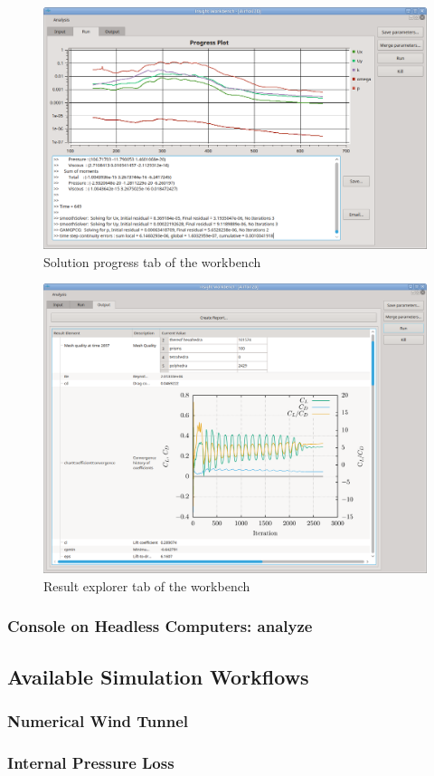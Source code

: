 \begin{figure}[tb]
\centering
\includegraphics[width=\linewidth]{figs/workbench/workbench_airfoil_run}
\caption{Solution progress tab of the workbench}
\label{fig:workbench_progress}
\end{figure}

\begin{figure}[tb]
\centering
\includegraphics[width=\linewidth]{figs/workbench/workbench_airfoil_result}
\caption{Result explorer tab of the workbench}
\label{fig:workbench_result}
\end{figure}

\subsubsection{Console on Headless Computers: analyze}\label{sec:analyze}


\subsection{Available Simulation Workflows}

\subsubsection{Numerical Wind Tunnel}

\subsubsection{Internal Pressure Loss}
